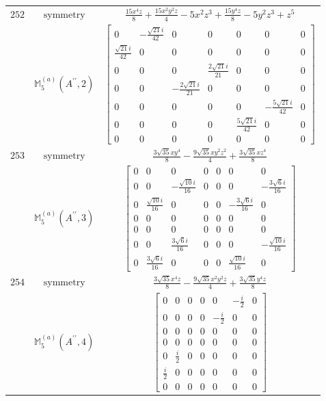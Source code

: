 \documentclass[fleqn,8pt,landscape]{jsarticle}
\begin{document}
\begin{longtable}{ccc}
$ 252 $ & $ \text{symmetry} $ & $ \frac{15 x^{4} z}{8} + \frac{15 x^{2} y^{2} z}{4} - 5 x^{2} z^{3} + \frac{15 y^{4} z}{8} - 5 y^{2} z^{3} + z^{5} $ \\
$  $ & $ \mathbb{M}_{5}^{(a)}(A^{\prime\prime},2) $ & $ \begin{bmatrix} 0 & - \frac{\sqrt{21} i}{42} & 0 & 0 & 0 & 0 & 0 \\ \frac{\sqrt{21} i}{42} & 0 & 0 & 0 & 0 & 0 & 0 \\ 0 & 0 & 0 & \frac{2 \sqrt{21} i}{21} & 0 & 0 & 0 \\ 0 & 0 & - \frac{2 \sqrt{21} i}{21} & 0 & 0 & 0 & 0 \\ 0 & 0 & 0 & 0 & 0 & - \frac{5 \sqrt{21} i}{42} & 0 \\ 0 & 0 & 0 & 0 & \frac{5 \sqrt{21} i}{42} & 0 & 0 \\ 0 & 0 & 0 & 0 & 0 & 0 & 0 \end{bmatrix} $ \\ \hline
$ 253 $ & $ \text{symmetry} $ & $ \frac{3 \sqrt{35} x y^{4}}{8} - \frac{9 \sqrt{35} x y^{2} z^{2}}{4} + \frac{3 \sqrt{35} x z^{4}}{8} $ \\
$  $ & $ \mathbb{M}_{5}^{(a)}(A^{\prime\prime},3) $ & $ \begin{bmatrix} 0 & 0 & 0 & 0 & 0 & 0 & 0 \\ 0 & 0 & - \frac{\sqrt{10} i}{16} & 0 & 0 & 0 & - \frac{3 \sqrt{6} i}{16} \\ 0 & \frac{\sqrt{10} i}{16} & 0 & 0 & 0 & - \frac{3 \sqrt{6} i}{16} & 0 \\ 0 & 0 & 0 & 0 & 0 & 0 & 0 \\ 0 & 0 & 0 & 0 & 0 & 0 & 0 \\ 0 & 0 & \frac{3 \sqrt{6} i}{16} & 0 & 0 & 0 & - \frac{\sqrt{10} i}{16} \\ 0 & \frac{3 \sqrt{6} i}{16} & 0 & 0 & 0 & \frac{\sqrt{10} i}{16} & 0 \end{bmatrix} $ \\ \hline
$ 254 $ & $ \text{symmetry} $ & $ \frac{3 \sqrt{35} x^{4} z}{8} - \frac{9 \sqrt{35} x^{2} y^{2} z}{4} + \frac{3 \sqrt{35} y^{4} z}{8} $ \\
$  $ & $ \mathbb{M}_{5}^{(a)}(A^{\prime\prime},4) $ & $ \begin{bmatrix} 0 & 0 & 0 & 0 & 0 & - \frac{i}{2} & 0 \\ 0 & 0 & 0 & 0 & - \frac{i}{2} & 0 & 0 \\ 0 & 0 & 0 & 0 & 0 & 0 & 0 \\ 0 & 0 & 0 & 0 & 0 & 0 & 0 \\ 0 & \frac{i}{2} & 0 & 0 & 0 & 0 & 0 \\ \frac{i}{2} & 0 & 0 & 0 & 0 & 0 & 0 \\ 0 & 0 & 0 & 0 & 0 & 0 & 0 \end{bmatrix} $ \\ \hline

\end{longtable}
\end{document}
